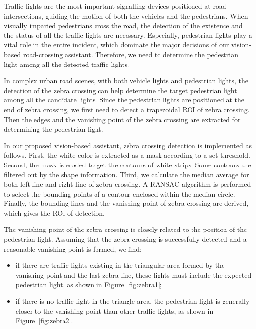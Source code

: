 Traffic lights are the most important signalling devices positioned at road intersections, guiding the motion of both the vehicles and the pedestrians. When visually imparied pedestrians cross the road, the detection of the existence and the status of all the traffic lights are necessary. Especially, pedestrian lights play a vital role in the entire incident, which dominate the major decisions of our vision-based road-crossing assistant. Therefore, we need to determine the pedestrian light among all the detected traffic lights.



 In complex urban road scenes, with both vehicle lights and pedestrian lights, the detection of the zebra crossing can help determine the target pedestrian light among all the candidate lights. Since the pedestrian lights are positioned at the end of zebra crossing, we first need to detect a trapezoidal ROI of zebra crossing. Then the edges and the vanishing point of the zebra crossing are extracted for determining the pedestrian light. 


In our proposed vision-based assistant, zebra crossing detection is implemented as follows. First, the white color is extracted as a mask according to a set threshold. Second, the mask is eroded to get the contours of white strips. Some contours are filtered out by the shape information. Third, we calculate the median average for both left line and right line of zebra crossing. A RANSAC algorithm is performed to select the bounding points of a contour enclosed within the median circle. Finally, the bounding lines and the vanishing point of zebra crossing are derived, which gives the ROI of detection.

 The vanishing point of the zebra crossing is closely related to the position of the pedestrian light. Assuming that the zebra crossing is successfully detected and a reasonable vanishing point is formed, we find: 
\begin{itemize}
\item if there are traffic lights existing in the triangular area formed by the vanishing point and the last zebra line, these lights must include the expected pedestrian light, as shown in Figure~\ref{fig:zebra1}; 
\item if there is no traffic light in the triangle area, the pedestrian light is generally closer to the vanishing point than other traffic lights, as shown in Figure~\ref{fig:zebra2}.
\end{itemize}

